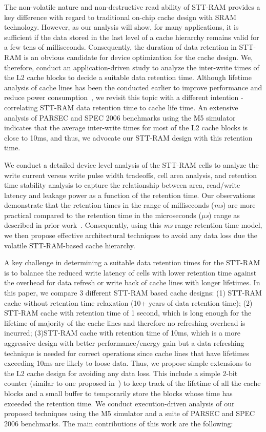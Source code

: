 The non-volatile nature and non-destructive read ability of STT-RAM provides a key difference with
regard to traditional on-chip cache design with SRAM technology. However, as our analysis will show,
for many applications, it is sufficient if the data stored in the last level of a cache hierarchy
remains valid for a few tens of milliseconds. Consequently, the duration of data retention in STT-RAM
is an obvious candidate for device optimization for the cache design. We, therefore, conduct an
application-driven study to analyze the inter-write times of the L2 cache blocks to decide a suitable
data retention time. Although lifetime analysis of cache lines has been the conducted earlier to
improve performance and reduce power consumption~\cite{cache-decay-2001,3t1d-cache}, we revisit this
topic with a different intention - correlating STT-RAM data retention time to cache life time. An
extensive analysis of PARSEC and SPEC 2006 benchmarks using the M5 simulator~\cite{M5} indicates that
the average inter-write times for most of the L2 cache blocks is close to 10ms, and thus, we advocate
our STT-RAM design with this retention time.

We conduct a detailed device level analysis of the STT-RAM cells to analyze the write current versus
write pulse width tradeoffs, cell area analysis, and retention time stability analysis to capture the
relationship between area, read/write latency and leakage power as a function of the retention time.
Our observations demonstrate that the retention
times in the range of milliseconds ({\it ms}) are more practical compared to the retention time in the microseconds
({\it $\mu$s}) range as described in prior work~\cite{STTRAM:HPCA11}. Consequently, using this {\it ms} range retention time model, we then propose effective
architectural techniques to avoid any data loss due the volatile STT-RAM-based cache hierarchy.

A key challenge in determining a suitable data retention times for the STT-RAM is to balance the
reduced write latency of cells with lower retention time against the overhead for data refresh or
write back of cache lines with longer lifetimes. In this paper, we compare 3 different STT-RAM based
cache designs: (1) STT-RAM cache without retention time relaxation (10+ years of data retention
time); (2) STT-RAM cache with retention time of 1 second, which is long enough for the lifetime of
majority of the cache lines and therefore no refreshing overhead is incurred; (3)STT-RAM cache with
retention time of 10ms, which is a more aggressive design with better performance/energy gain but a
data refreshing technique is needed for correct operations since cache lines that have lifetimes
exceeding 10ms are likely to loose data. Thus, we propose simple extensions to the L2 cache design
for avoiding any data loss. This include a simple 2-bit counter (similar to one proposed
in~\cite{cache-decay-2001}) to keep track of the lifetime of all the cache blocks and a small buffer
to temporarily store the blocks whose time has exceeded the retention time. We conduct
execution-driven analysis of our proposed techniques using the M5 simulator and a suite of PARSEC and
SPEC 2006 benchmarks. The main contributions of this work are the following:

